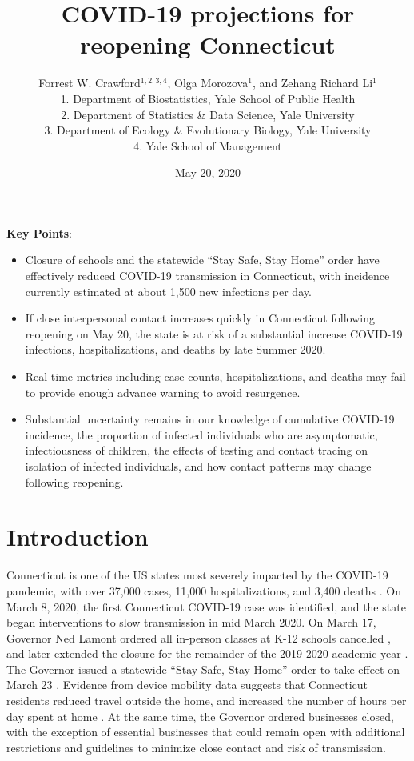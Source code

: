 \documentclass[11pt]{article}
\title{COVID-19 projections for reopening Connecticut}
\author{
  Forrest W. Crawford$^{1,2,3,4}$,
  Olga Morozova$^{1}$, 
  and
  Zehang Richard Li$^1$
  \\[1em]
\small 1. Department of Biostatistics, Yale School of Public Health \\
\small 2. Department of Statistics \& Data Science, Yale University \\
\small 3. Department of Ecology \& Evolutionary Biology, Yale University \\
\small 4. Yale School of Management }
\date{May 20, 2020}
\begin{document}
\maketitle


\textbf{Key Points}:
\vspace{-0.5em}
\begin{itemize}[itemsep=0em, parsep=0em, topsep=0em]
  \item Closure of schools and the statewide ``Stay Safe, Stay Home'' order have effectively reduced COVID-19 transmission in Connecticut, with incidence currently estimated at about 1,500 new infections per day.
  \item If close interpersonal contact increases quickly in Connecticut following reopening on May 20, the state is at risk of a substantial increase COVID-19 infections, hospitalizations, and deaths by late Summer 2020.
  \item Real-time metrics including case counts, hospitalizations, and deaths may fail to provide enough advance warning to avoid resurgence.  
  \item Substantial uncertainty remains in our knowledge of cumulative COVID-19 incidence, the proportion of infected individuals who are asymptomatic, infectiousness of children, the effects of testing and contact tracing on isolation of infected individuals, and how contact patterns may change following reopening.  
\end{itemize}



\section*{Introduction}

Connecticut is one of the US states most severely impacted by the COVID-19 pandemic, with over 37,000 cases, 11,000 hospitalizations, and 3,400 deaths \citep{nyt2020Connecticut,atlantic2020data}.  On March 8, 2020, the first Connecticut COVID-19 case was identified, and the state began interventions to slow transmission in mid March 2020.  On March 17, Governor Ned Lamont ordered all in-person classes at K-12 schools cancelled \citep{lamont2020exec7c}, and later extended the closure for the remainder of the 2019-2020 academic year \citep{lamont2020exec7l,lamont2020exec7x,lamont2020exec7ii}.  The Governor issued a statewide ``Stay Safe, Stay Home'' order to take effect on March 23 \citep{lamont2020exec7h}.  Evidence from device mobility data suggests that Connecticut residents reduced travel outside the home, and increased the number of hours per day spent at home \citep{google2020covid,facebook2020covid}. At the same time, the Governor ordered businesses closed, with the exception of essential businesses that could remain open with additional restrictions and guidelines to minimize close contact and risk of transmission. 
\end{document}
